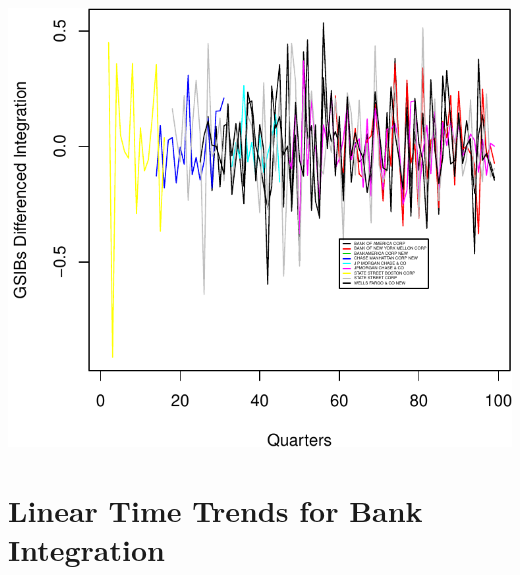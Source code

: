 \documentclass[11pt,]{article}
\begin{document}
\begin{center}\includegraphics{AC_US_Bank_Int_Results_1_files/figure-latex/Diff-1} \end{center}

\section{Linear Time Trends for Bank
Integration}\label{linear-time-trends-for-bank-integration}
\end{document}
